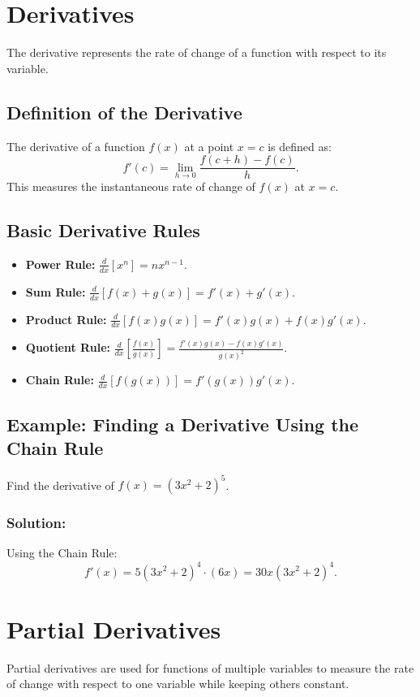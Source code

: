 \documentclass[12pt]{article}
\begin{document}
\section{Derivatives}
The derivative represents the rate of change of a function with respect to its variable.

\subsection*{Definition of the Derivative}
The derivative of a function $f(x)$ at a point $x = c$ is defined as:
\[ f'(c) = \lim_{h \to 0} \frac{f(c + h) - f(c)}{h}. \]
This measures the instantaneous rate of change of $f(x)$ at $x = c$.

\subsection*{Basic Derivative Rules}
\begin{itemize}
    \item \textbf{Power Rule:} $\frac{d}{dx}[x^n] = nx^{n-1}$.
    \item \textbf{Sum Rule:} $\frac{d}{dx}[f(x) + g(x)] = f'(x) + g'(x)$.
    \item \textbf{Product Rule:} $\frac{d}{dx}[f(x)g(x)] = f'(x)g(x) + f(x)g'(x)$.
    \item \textbf{Quotient Rule:} $\frac{d}{dx}\left[\frac{f(x)}{g(x)}\right] = \frac{f'(x)g(x) - f(x)g'(x)}{g(x)^2}$.
    \item \textbf{Chain Rule:} $\frac{d}{dx}[f(g(x))] = f'(g(x))g'(x)$.
\end{itemize}

\subsection*{Example: Finding a Derivative Using the Chain Rule}
Find the derivative of $f(x) = (3x^2 + 2)^5$.

\subsubsection*{Solution:}
Using the Chain Rule:
\[ f'(x) = 5(3x^2 + 2)^4 \cdot (6x) = 30x(3x^2 + 2)^4. \]

\section{Partial Derivatives}
Partial derivatives are used for functions of multiple variables to measure the rate of change with respect to one variable while keeping others constant.
\end{document}

